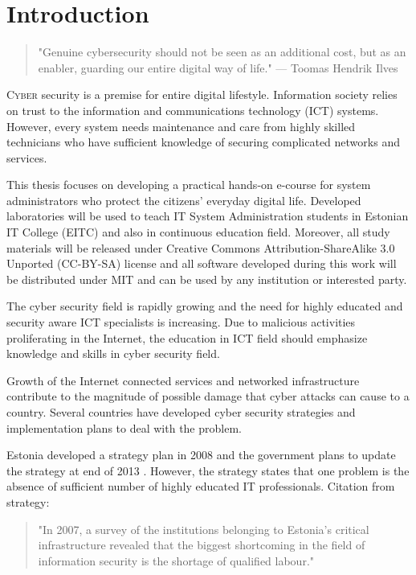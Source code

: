 \chapter{Introduction}
\label{Introduction}

 
\begin{quote}
"Genuine cybersecurity should not be seen as an additional cost, but as an enabler, guarding our entire digital way of life." --- Toomas Hendrik Ilves
\end{quote}

\lettrine[lraise=0.1, nindent=0em, slope=-.5em]{\color{Violet}C}{yber} security is a premise for entire digital lifestyle. Information society relies on trust to the information and communications technology (\gls{ICT}) systems. However, every system needs maintenance and care from highly skilled technicians who have sufficient knowledge of securing complicated networks and services. 

This thesis focuses on developing a practical hands-on e-course for system administrators who protect the citizens' everyday digital life. Developed laboratories will be used to teach IT System Administration students in Estonian IT College (\gls{EITC}) and also in continuous education field. Moreover, all study materials will be released under Creative Commons Attribution-ShareAlike 3.0 Unported  (\gls{CC-BY-SA}) license and all software developed during this work will be distributed under \gls{MIT} and can be used by any institution or interested party.

The cyber security field is rapidly growing and the need for highly educated and security aware \gls{ICT} specialists is increasing. Due to  malicious activities proliferating in the Internet, the education in \gls{ICT} field should emphasize knowledge and skills in cyber security field.

Growth of the Internet connected services and networked infrastructure contribute to the magnitude of possible damage that cyber attacks can cause to a country. Several countries have developed cyber security strategies and implementation plans to deal with the problem.

Estonia developed a strategy plan in 2008 \citep{Strategy2008} and the government plans to update the strategy at end of 2013 \citep{StrategyProposal2013}. However, the strategy states that one problem is the absence of sufficient number of highly educated IT professionals. Citation from strategy:  
\begin{quote}
"In 2007, a survey of the institutions belonging to Estonia’s critical infrastructure revealed that the biggest shortcoming in the field of information security is the shortage of qualified labour." \citep[p.~16]{Strategy2008}
\end{quote}

